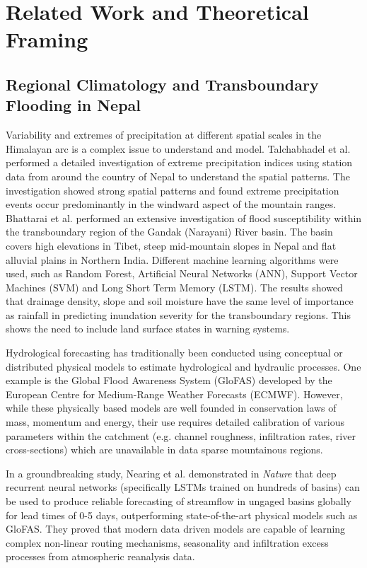 \documentclass[journal]{IEEEtran}
\begin{document}
\section{Related Work and Theoretical Framing}

\subsection{Regional Climatology and Transboundary Flooding in Nepal}
Variability and extremes of precipitation at different spatial scales in the Himalayan arc is a complex issue to understand and model. Talchabhadel et al. \cite{talchabhadel2018spatio} performed a detailed investigation of extreme precipitation indices using station data from around the country of Nepal to understand the spatial patterns. The investigation showed strong spatial patterns and found extreme precipitation events occur predominantly in the windward aspect of the mountain ranges. Bhattarai et al. \cite{bhattarai2024leveraging} performed an extensive investigation of flood susceptibility within the transboundary region of the Gandak (Narayani) River basin. The basin covers high elevations in Tibet, steep mid-mountain slopes in Nepal and flat alluvial plains in Northern India. Different machine learning algorithms were used, such as Random Forest, Artificial Neural Networks (ANN), Support Vector Machines (SVM) and Long Short Term Memory (LSTM). The results showed that drainage density, slope and soil moisture have the same level of importance as rainfall in predicting inundation severity for the transboundary regions. This shows the need to include land surface states in warning systems.

Hydrological forecasting has traditionally been conducted using conceptual or distributed physical models to estimate hydrological and hydraulic processes. One example is the Global Flood Awareness System (GloFAS) \cite{alfieri2013glofas} developed by the European Centre for Medium-Range Weather Forecasts (ECMWF). However, while these physically based models are well founded in conservation laws of mass, momentum and energy, their use requires detailed calibration of various parameters within the catchment (e.g. channel roughness, infiltration rates, river cross-sections) which are unavailable in data sparse mountainous regions.

In a groundbreaking study, Nearing et al. \cite{nearing2024global} demonstrated in \textit{Nature} that deep recurrent neural networks (specifically LSTMs trained on hundreds of basins) can be used to produce reliable forecasting of streamflow in ungaged basins globally for lead times of 0-5 days, outperforming state-of-the-art physical models such as GloFAS. They proved that modern data driven models are capable of learning complex non-linear routing mechanisms, seasonality and infiltration excess processes from atmospheric reanalysis data.
\end{document}
